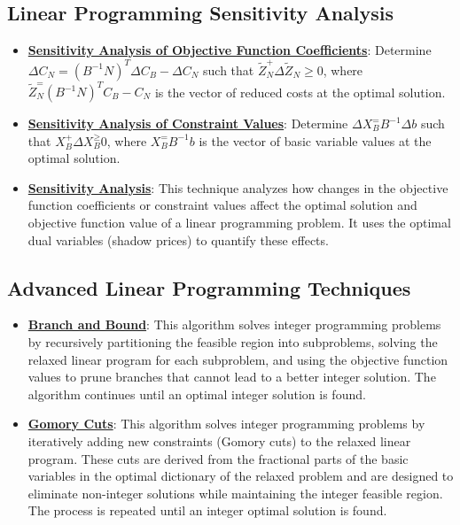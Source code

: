 \documentclass{article}%
\begin{document}
\subsection{Linear Programming Sensitivity Analysis}%
\label{subsec:LinearProgrammingSensitivityAnalysis}%
\begin{itemize}[leftmargin=*]%
\item \href{https://www.math.purdue.edu/~yipn/421//2024-09-26-Sensitivity.pdf#page=7}{\textbf{Sensitivity Analysis of Objective Function Coefficients}}: Determine $\Delta C_N = (B^{-1}N)^T\Delta C_B - \Delta C_N$ such that $\tilde{Z}_N^ + \Delta \tilde{Z}_N \ge 0$, where $\tilde{Z}_N^ = (B^{-1}N)^TC_B - C_N$ is the vector of reduced costs at the optimal solution.%
\item \href{https://www.math.purdue.edu/~yipn/421//2024-09-26-Sensitivity.pdf#page=11}{\textbf{Sensitivity Analysis of Constraint Values}}: Determine $\Delta X_B^ = B^{-1}\Delta b$ such that $X_B^ + \Delta X_B^ \ge 0$, where $X_B^ = B^{-1}b$ is the vector of basic variable values at the optimal solution.%
\item \href{https://www.math.purdue.edu/~yipn/421//2024-10-01-SensitivityDuality.pdf#page=7}{\textbf{Sensitivity Analysis}}: This technique analyzes how changes in the objective function coefficients or constraint values affect the optimal solution and objective function value of a linear programming problem.  It uses the optimal dual variables (shadow prices) to quantify these effects.%
\end{itemize}

%
\subsection{Advanced Linear Programming Techniques}%
\label{subsec:AdvancedLinearProgrammingTechniques}%
\begin{itemize}[leftmargin=*]%
\item \href{https://www.math.purdue.edu/~yipn/421//2024-10-31-IntLinProg.pdf#page=5}{\textbf{Branch and Bound}}: This algorithm solves integer programming problems by recursively partitioning the feasible region into subproblems, solving the relaxed linear program for each subproblem, and using the objective function values to prune branches that cannot lead to a better integer solution.  The algorithm continues until an optimal integer solution is found.%
\item \href{https://www.math.purdue.edu/~yipn/421//2024-10-31-IntLinProg.pdf#page=15}{\textbf{Gomory Cuts}}: This algorithm solves integer programming problems by iteratively adding new constraints (Gomory cuts) to the relaxed linear program.  These cuts are derived from the fractional parts of the basic variables in the optimal dictionary of the relaxed problem and are designed to eliminate non-integer solutions while maintaining the integer feasible region. The process is repeated until an integer optimal solution is found.%
\end{itemize}
\end{document}
